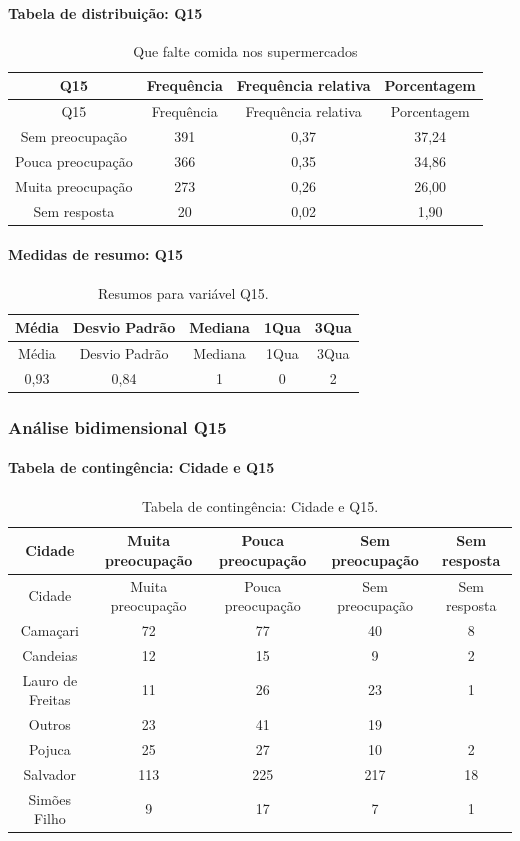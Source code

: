 \documentclass[]{article}
\let\oldparagraph\paragraph
\renewcommand{\paragraph}[1]{\oldparagraph{#1}\mbox{}}
\begin{document}
\hypertarget{tabela-de-distribuiuxe7uxe3o-q15}{%
\paragraph{Tabela de distribuição: Q15}\label{tabela-de-distribuiuxe7uxe3o-q15}}

\begin{longtable}[]{@{}cccc@{}}
\caption{\label{tab:unnamed-chunk-70}Que falte comida nos supermercados}\tabularnewline
\toprule
Q15 & Frequência & Frequência relativa & Porcentagem\tabularnewline
\midrule
\endfirsthead
\toprule
Q15 & Frequência & Frequência relativa & Porcentagem\tabularnewline
\midrule
\endhead
Sem preocupação & 391 & 0,37 & 37,24\tabularnewline
Pouca preocupação & 366 & 0,35 & 34,86\tabularnewline
Muita preocupação & 273 & 0,26 & 26,00\tabularnewline
Sem resposta & 20 & 0,02 & 1,90\tabularnewline
\bottomrule
\end{longtable}

\hypertarget{medidas-de-resumo-q15}{%
\paragraph{Medidas de resumo: Q15}\label{medidas-de-resumo-q15}}

\begin{longtable}[]{@{}ccccc@{}}
\caption{\label{tab:unnamed-chunk-71}Resumos para variável Q15.}\tabularnewline
\toprule
Média & Desvio Padrão & Mediana & 1Qua & 3Qua\tabularnewline
\midrule
\endfirsthead
\toprule
Média & Desvio Padrão & Mediana & 1Qua & 3Qua\tabularnewline
\midrule
\endhead
0,93 & 0,84 & 1 & 0 & 2\tabularnewline
\bottomrule
\end{longtable}

\cleardoublepage

\hypertarget{anuxe1lise-bidimensional-q15}{%
\subsubsection{Análise bidimensional Q15}\label{anuxe1lise-bidimensional-q15}}

\hypertarget{tabela-de-continguxeancia-cidade-e-q15}{%
\paragraph{Tabela de contingência: Cidade e Q15}\label{tabela-de-continguxeancia-cidade-e-q15}}

\begin{longtable}[]{@{}ccccc@{}}
\caption{\label{tab:unnamed-chunk-72}Tabela de contingência: Cidade e Q15.}\tabularnewline
\toprule
Cidade & Muita preocupação & Pouca preocupação & Sem preocupação & Sem resposta\tabularnewline
\midrule
\endfirsthead
\toprule
Cidade & Muita preocupação & Pouca preocupação & Sem preocupação & Sem resposta\tabularnewline
\midrule
\endhead
Camaçari & 72 & 77 & 40 & 8\tabularnewline
Candeias & 12 & 15 & 9 & 2\tabularnewline
Lauro de Freitas & 11 & 26 & 23 & 1\tabularnewline
Outros & 23 & 41 & 19 &\tabularnewline
Pojuca & 25 & 27 & 10 & 2\tabularnewline
Salvador & 113 & 225 & 217 & 18\tabularnewline
Simões Filho & 9 & 17 & 7 & 1\tabularnewline
\bottomrule
\end{longtable}
\end{document}
